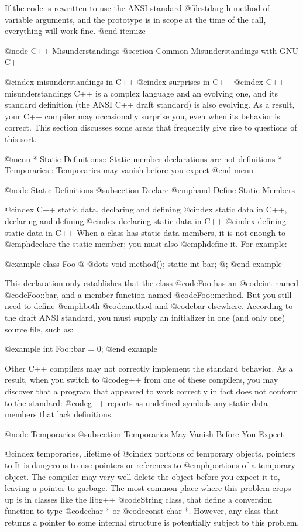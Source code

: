 If the code is rewritten to use the ANSI standard @file{stdarg.h}
method of variable arguments, and the prototype is in scope at
the time of the call, everything will work fine.
@end itemize

@node C++ Misunderstandings
@section Common Misunderstandings with GNU C++

@cindex misunderstandings in C++
@cindex surprises in C++
@cindex C++ misunderstandings
C++ is a complex language and an evolving one, and its standard definition
(the ANSI C++ draft standard) is also evolving.  As a result, 
your C++ compiler may occasionally surprise you, even when its behavior is
correct.  This section discusses some areas that frequently give rise to
questions of this sort.

@menu
* Static Definitions::  Static member declarations are not definitions
* Temporaries::         Temporaries may vanish before you expect
@end menu

@node Static Definitions
@subsection Declare @emph{and} Define Static Members

@cindex C++ static data, declaring and defining
@cindex static data in C++, declaring and defining
@cindex declaring static data in C++
@cindex defining static data in C++
When a class has static data members, it is not enough to @emph{declare}
the static member; you must also @emph{define} it.  For example:

@example
class Foo
@{
  @dots{}
  void method();
  static int bar;
@};
@end example

This declaration only establishes that the class @code{Foo} has an
@code{int} named @code{Foo::bar}, and a member function named
@code{Foo::method}.  But you still need to define @emph{both}
@code{method} and @code{bar} elsewhere.  According to the draft ANSI
standard, you must supply an initializer in one (and only one) source
file, such as:

@example
int Foo::bar = 0;
@end example

Other C++ compilers may not correctly implement the standard behavior.
As a result, when you switch to @code{g++} from one of these compilers,
you may discover that a program that appeared to work correctly in fact
does not conform to the standard: @code{g++} reports as undefined
symbols any static data members that lack definitions.

@node Temporaries
@subsection Temporaries May Vanish Before You Expect

@cindex temporaries, lifetime of
@cindex portions of temporary objects, pointers to
It is dangerous to use pointers or references to @emph{portions} of a
temporary object.  The compiler may very well delete the object before
you expect it to, leaving a pointer to garbage.  The most common place
where this problem crops up is in classes like the libg++
@code{String} class, that define a conversion function to type
@code{char *} or @code{const char *}.  However, any class that returns
a pointer to some internal structure is potentially subject to this
problem.

